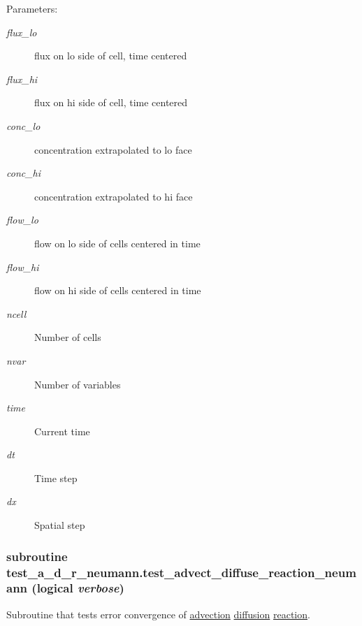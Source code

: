 \begin{Desc}
\item[Parameters:]
\begin{description}
\item[{\em flux\_\-lo}]flux on lo side of cell, time centered\item[{\em flux\_\-hi}]flux on hi side of cell, time centered\item[{\em conc\_\-lo}]concentration extrapolated to lo face\item[{\em conc\_\-hi}]concentration extrapolated to hi face\item[{\em flow\_\-lo}]flow on lo side of cells centered in time\item[{\em flow\_\-hi}]flow on hi side of cells centered in time\item[{\em ncell}]Number of cells\item[{\em nvar}]Number of variables\item[{\em time}]Current time\item[{\em dt}]Time step \item[{\em dx}]Spatial step \end{description}
\end{Desc}
\hypertarget{a00073_b372cb5a88b5e4676a429d2b7480e751}{
\subsubsection[{test\_\-advect\_\-diffuse\_\-reaction\_\-neumann}]{\setlength{\rightskip}{0pt plus 5cm}subroutine test\_\-a\_\-d\_\-r\_\-neumann.test\_\-advect\_\-diffuse\_\-reaction\_\-neumann (logical {\em verbose})}}
\label{a00073_b372cb5a88b5e4676a429d2b7480e751}


Subroutine that tests error convergence of \hyperlink{a00052}{advection} \hyperlink{a00056}{diffusion} \hyperlink{a00068}{reaction}. 

